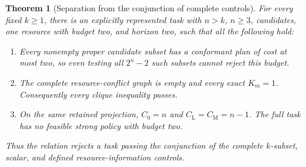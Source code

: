 \documentclass[11pt]{article}
\newtheorem{theorem}{Theorem}[section]
\theoremstyle{definition}
\newcommand{\CL}{C_{\mathrm L}}
\newcommand{\CM}{C_{\mathrm M}}
\begin{document}
\begin{theorem}[Separation from the conjunction of complete controls]\label{thm:separate}
For every fixed $k\geq1$, there is an explicitly represented task with
$n>k$, $n\geq3$, candidates, one resource with budget two, and horizon two,
such that all the following hold:
\begin{enumerate}[label=(\roman*)]
\item Every nonempty proper candidate subset has a conformant plan of cost at
most two, so even testing all $2^n-2$ such subsets cannot reject this budget.
\item The complete resource-conflict graph is empty and every exact $K_m=1$.
Consequently every clique inequality passes.
\item On the same retained projection, $C_0=n$ and $\CL=\CM=n-1$.
The full task has no feasible strong policy with budget two.
\end{enumerate}
Thus the relation rejects a task passing the conjunction of the complete
$k$-subset, scalar, and defined resource-information controls.
\end{theorem}
\end{document}
